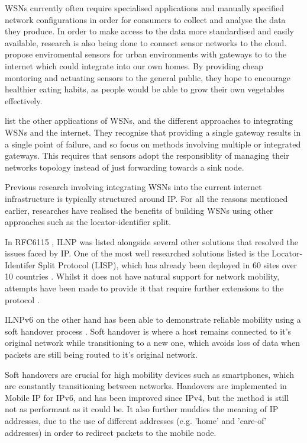 \documentclass[12pt]{article}
\begin{document}
WSNs currently often require specialised applications and manually specified network configurations in order for consumers to collect and analyse the data they produce. In order to make access to the data more standardised and easily available, research is also being done to connect sensor networks to the cloud. \cite{indoor} propose enviromental sensors for urban environments with gateways to to the internet which could integrate into our own homes. By providing cheap montoring and actuating sensors to the general public, they hope to encourage healthier eating habits, as people would be able to grow their own vegetables effectively. 

\cite{wsnlist} list the other applications of WSNs, and the different approaches to integrating WSNs and the internet. They recognise that providing a single gateway results in a single point of failure, and so focus on methods involving multiple or integrated gateways. This requires that sensors adopt the responsiblity of managing their networks topology instead of just forwarding towards a sink node. 

Previous research involving integrating WSNs into the current internet infrastructure is typically structured around IP. For all the reasons mentioned earlier, researches have realised the benefits of building WSNs using other approaches such as the locator-identifier split.

In RFC6115 \cite{rfc6115}, ILNP was listed alongside several other solutions that resolved the issues faced by IP. One of the most well researched solutions listed is the Locator-Identifer Split Protocol (LISP), which has already been deployed in 60 sites over 10 countries \cite{nahla}. Whilst it does not have natural support for network mobility, attempts have been made to provide it that require further extensions to the protocol \cite{moblisp}. 

ILNPv6 on the other hand has been able to demonstrate reliable mobility using a soft handover process \cite{shilnp}. Soft handover is where a host remains connected to it's original network while transitioning to a new one, which avoids loss of data when packets are still being routed to it's original network. 

Soft handovers are crucial for high mobility devices such as smartphones, which are constantly transitioning between networks. Handovers are implemented in Mobile IP for IPv6, and has been improved since IPv4, but the method is still not as performant as it could be. It also further muddies the meaning of IP addresses, due to the use of different addresses (e.g. 'home' and 'care-of' addresses) in order to redirect packets to the mobile node. 
\end{document}
